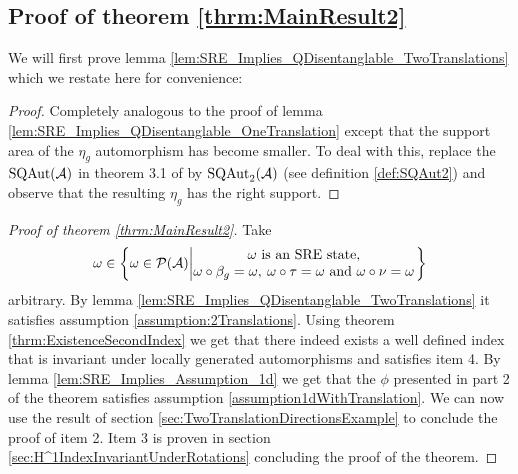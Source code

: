 \documentclass[12pt,a4paper,twoside]{article}
\numberwithin{equation}{section}
\begin{document}
\subsection{Proof of theorem \ref{thrm:MainResult2}}\label{sec:ProofOfMainResult2}
We will first prove lemma \ref{lem:SRE_Implies_QDisentanglable_TwoTranslations} which we restate here for convenience:
\SREImpliesQDisentanglableTwoTranslations*
\begin{proof}
	Completely analogous to the proof of lemma \ref{lem:SRE_Implies_QDisentanglable_OneTranslation} except that the support area of the $\eta_g$ automorphism has become smaller. To deal with this, replace the $\textrm{SQAut}(\AA)$ in theorem 3.1 of \cite{ogata2021h3gmathbb} by $\textrm{SQAut}_2(\AA)$ (see definition \ref{def:SQAut2}) and observe that the resulting $\eta_g$ has the right support.
\end{proof}
\begin{proof}[Proof of theorem \ref{thrm:MainResult2}]
	Take
	\begin{equation}
	\omega\in\left\{\omega\in\PP(\AA)\left| \begin{matrix}\omega\text{ is an SRE state,}\\\omega\circ\beta_g=\omega,\:\omega\circ\tau=\omega\text{ and }\omega\circ\nu=\omega\end{matrix} \right.\right\}
	\end{equation}
	arbitrary. By lemma \ref{lem:SRE_Implies_QDisentanglable_TwoTranslations} it satisfies assumption \ref{assumption:2Translations}. Using theorem \ref{thrm:ExistenceSecondIndex} we get that there indeed exists a well defined index that is invariant under locally generated automorphisms and satisfies item 4. By lemma \ref{lem:SRE_Implies_Assumption_1d} we get that the $\phi$ presented in part 2 of the theorem satisfies assumption \ref{assumption1dWithTranslation}. We can now use the result of section \ref{sec:TwoTranslationDirectionsExample} to conclude the proof of item 2. Item 3 is proven in section \ref{sec:H^1IndexInvariantUnderRotations} concluding the proof of the theorem.
\end{proof}
\appendix
\end{document}
